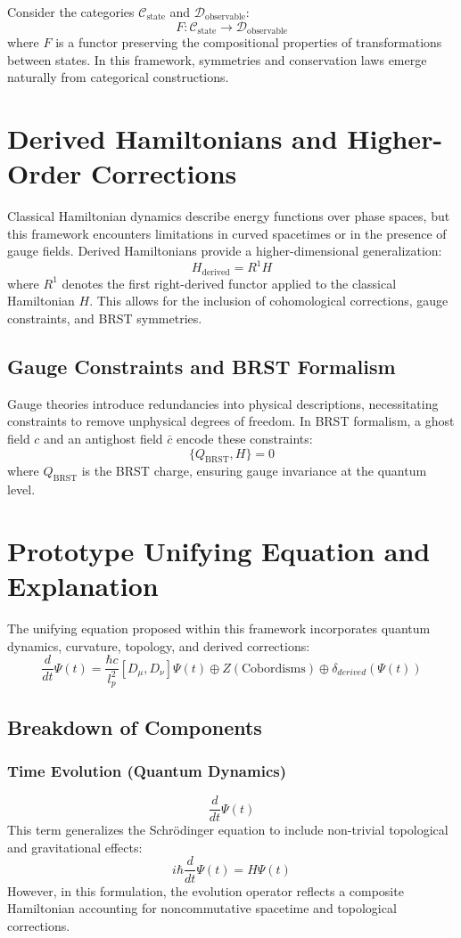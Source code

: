\documentclass[12pt]{article}
\begin{document}
Consider the categories \( \mathcal{C}_{\text{state}} \) and \( \mathcal{D}_{\text{observable}} \):
\[
F : \mathcal{C}_{\text{state}} \to \mathcal{D}_{\text{observable}}
\]
where \( F \) is a functor preserving the compositional properties of transformations between states. In this framework, symmetries and conservation laws emerge naturally from categorical constructions.

\section{Derived Hamiltonians and Higher-Order Corrections}
Classical Hamiltonian dynamics describe energy functions over phase spaces, but this framework encounters limitations in curved spacetimes or in the presence of gauge fields. Derived Hamiltonians provide a higher-dimensional generalization:
\[
H_{\text{derived}} = R^1 H
\]
where \( R^1 \) denotes the first right-derived functor applied to the classical Hamiltonian \( H \). This allows for the inclusion of cohomological corrections, gauge constraints, and BRST symmetries.

\subsection{Gauge Constraints and BRST Formalism}
Gauge theories introduce redundancies into physical descriptions, necessitating constraints to remove unphysical degrees of freedom. In BRST formalism, a ghost field \( c \) and an antighost field \( \bar{c} \) encode these constraints:
\[
\{ Q_{\text{BRST}}, H \} = 0
\]
where \( Q_{\text{BRST}} \) is the BRST charge, ensuring gauge invariance at the quantum level.

\section{Prototype Unifying Equation and Explanation}
The unifying equation proposed within this framework incorporates quantum dynamics, curvature, topology, and derived corrections:
\[
\frac{d}{dt}\Psi(t) = \frac{\hbar c}{l_p^2}[D_\mu, D_\nu]\Psi(t) \oplus Z(\text{Cobordisms}) \oplus \delta_{derived}(\Psi(t))
\]

\subsection{Breakdown of Components}
\subsubsection{Time Evolution (Quantum Dynamics)}
\[
\frac{d}{dt}\Psi(t)
\]
This term generalizes the Schrödinger equation to include non-trivial topological and gravitational effects:
\[
i \hbar \frac{d}{dt}\Psi(t) = H \Psi(t)
\]
However, in this formulation, the evolution operator reflects a composite Hamiltonian accounting for noncommutative spacetime and topological corrections.
\end{document}

